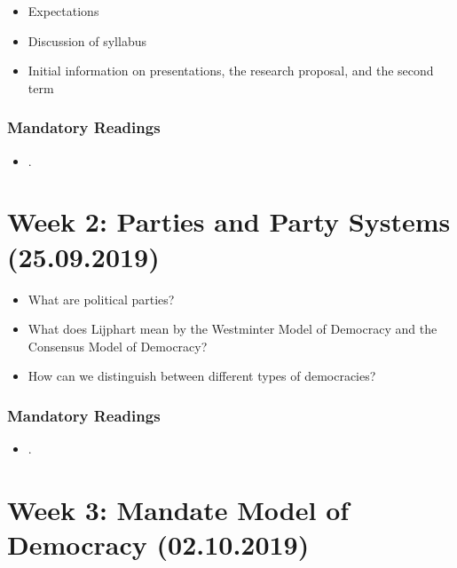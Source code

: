 \documentclass[abstract=on,parskip=full,headings=standardclasses,fontsize=11pt,paper=a4]{scrartcl}
\begin{document}
\begin{itemize}
\renewcommand\labelitemi{--}
\item Expectations
\item Discussion of syllabus
\item Initial information on presentations, the research proposal, and the second term 
\end{itemize}


\subsubsection*{Mandatory Readings}
\begin{itemize}
\item {}.
\end{itemize}


\section{Week 2: Parties and Party Systems (25.09.2019)}

\begin{itemize}
\renewcommand\labelitemi{--}
\item  What are political parties?
\item What does Lijphart mean by the Westminter Model of Democracy and the Consensus Model of Democracy?
\item How can we distinguish between different types of democracies?
\end{itemize}

\subsubsection*{Mandatory Readings}
\begin{itemize}
\item {}.
\end{itemize}



\section{Week 3:  Mandate Model of Democracy (02.10.2019)}
\end{document}
